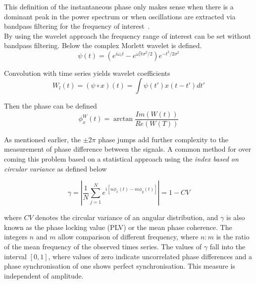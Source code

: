 \documentclass[]{article}
\begin{document}
This definition of the instantaneous phase only makes sense when
there is a dominant peak in the power spectrum or when oscillations
are extracted via bandpass
filtering for the frequency of interest~\cite{Rosenblum2004}.\\

By using the wavelet approach the frequency range of interest can be
set without bandpass filtering. Below the complex Morlett wavelet is
defined.
\begin{equation}
\psi(t) =
(e^{i\omega_ct}-e^{\omega_c^2t\sigma^2/2})e^{-t^2/2\sigma^2}
\end{equation}

Convolution with time series yields wavelet coefficients
\begin{equation}
W_l(t) = (\psi\circ x)(t) = \int\psi(t')x(t-t')dt'
\end{equation}

Then the phase can be defined
\begin{equation}
\phi_x^W(t)=\arctan\frac{Im(W(t))}{Re(W(T))}
\end{equation}

As mentioned earlier, the $\pm2\pi$ phase jumps add further
complexity to the measurement of phase difference between the
signals. A common method for over coming this problem based on a
statistical approach using the \emph{index based on circular
variance} as defined below

\begin{equation}
\gamma = |\frac{1}{N}\sum_{j=1}^N e^{i[n\phi_x(t)-m\phi_y(t)]}| =
1-CV
\end{equation}

where $CV$ denotes the circular variance of an angular distribution,
and $\gamma$ is also known as the phase locking value (PLV) or the
mean phase coherence. The integers $n$ and $m$ allow comparison of
different frequency, where $n:m$ is the ratio of the mean frequency
of the observed times series. The values of $\gamma$ fall into the
interval $[0,1]$, where values of zero indicate uncorrelated phase
differences and a phase synchronisation of one shows perfect
synchronisation. This measure is independent of amplitude.\\
\end{document}
